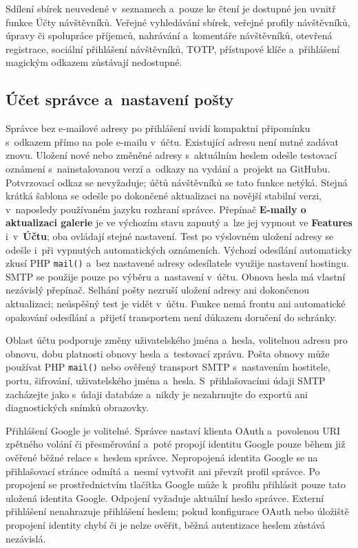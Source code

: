\documentclass[11pt,a4paper]{article}
\newcommand{\ui}[1]{\textbf{#1}}
\newcommand{\codeword}[1]{\nolinkurl{#1}}
\begin{document}
Sdílení sbírek neuvedené v~seznamech a~pouze ke čtení je dostupné jen uvnitř
funkce Účty návštěvníků. Veřejné vyhledávání sbírek, veřejné profily
návštěvníků, úpravy či spolupráce příjemců, nahrávání a~komentáře návštěvníků,
otevřená registrace, sociální přihlášení návštěvníků, TOTP, přístupové klíče
a~přihlášení magickým odkazem zůstávají nedostupné.

\subsection{Účet správce a~nastavení pošty}

Správce bez e-mailové adresy po přihlášení uvidí kompaktní připomínku s~odkazem
přímo na pole e-mailu v~účtu. Existující adresu není nutné zadávat znovu.
Uložení nové nebo změněné adresy s~aktuálním heslem odešle testovací oznámení
s~nainstalovanou verzí a~odkazy na vydání a~projekt na GitHubu. Potvrzovací odkaz
se nevyžaduje; účtů návštěvníků se tato funkce netýká. Stejná krátká šablona se
odešle po dokončené aktualizaci na novější stabilní verzi, v~naposledy používaném
jazyku rozhraní správce. Přepínač \ui{E-maily o aktualizaci galerie} je ve
výchozím stavu zapnutý a~lze jej vypnout ve \ui{Features} i~v~\ui{Účtu}; oba
ovládají stejné nastavení. Test po výslovném uložení adresy se odešle i~při
vypnutých automatických oznámeních. Výchozí odesílání automaticky zkusí PHP
\codeword{mail()} a~bez nastavené adresy odesílatele využije nastavení hostingu.
SMTP se použije pouze po výběru a~nastavení v~účtu. Obnova hesla má vlastní
nezávislý přepínač. Selhání pošty nezruší uložení adresy ani dokončenou
aktualizaci; neúspěšný test je vidět v~účtu. Funkce nemá frontu ani automatické
opakování odesílání a~přijetí transportem není důkazem doručení do schránky.

Oblast účtu podporuje změny uživatelského jména a~hesla, volitelnou adresu pro
obnovu, dobu platnosti obnovy hesla a~testovací zprávu. Pošta obnovy může
používat PHP \codeword{mail()} nebo ověřený transport SMTP s~nastavením
hostitele, portu, šifrování, uživatelského jména a~hesla. S~přihlašovacími údaji
SMTP zacházejte jako s~údaji databáze a~nikdy je nezahrnujte do exportů ani
diagnostických snímků obrazovky.

Přihlášení Google je volitelné. Správce nastaví klienta OAuth a~povolenou URI
zpětného volání či přesměrování a~poté propojí identitu Google pouze během již
ověřené běžné relace s~heslem správce. Nepropojená identita Google se na
přihlašovací stránce odmítá a~nesmí vytvořit ani převzít profil správce. Po
propojení se prostřednictvím tlačítka Google může k~profilu přihlásit pouze tato
uložená identita Google. Odpojení vyžaduje aktuální heslo správce. Externí
přihlášení nenahrazuje přihlášení heslem; pokud konfigurace OAuth nebo úložiště
propojení identity chybí či je nelze ověřit, běžná autentizace heslem zůstává
nezávislá.
\end{document}
